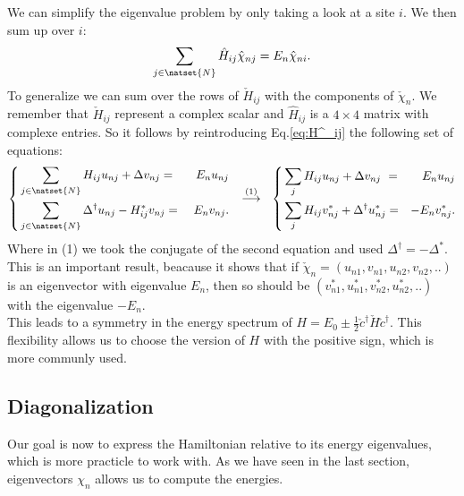 \documentclass[../main.tex]{subfile}
\begin{document}
We can simplify the eigenvalue problem by only taking a look at a site $i$. We then sum up over $i$: 
\[
    \sum_{j\in\natset{N}}\hat{H}_{ij} \hat{\chi}_{nj} = E_n \hat{\chi}_{ni}.
\]
To generalize we can sum over the rows of $\check{H}_{ij}$ with the components of $\check{\chi}_n$.
We remember that $\check{H}_{ij}$ represent a complex scalar and $\hat{H}_{ij}$ is a $4\times4$ matrix with complexe entries.
 So it follows by reintroducing Eq.\ref{eq:H^_ij} the following set of equations:
\begin{equation}
    \left\{
    \begin{aligned}
        &\sum_{j\in\natset{N}}H_{ij} u_{nj} + \Delta v_{nj} = &E_n u_{nj}\\
        &\sum_{j\in\natset{N}}\Delta^{\dagger} u_{nj} - H_{ij}^{\ast} v_{nj} =~& E_n v_{nj}.
    \end{aligned}
    \right.~~
    \stackrel{(1)}{\longrightarrow}~~
    \left\{
        \begin{aligned}
            &\sum_{j} H_{ij} u_{nj} + \Delta v_{nj} ~=& E_n u_{nj}\\
            &\sum_{j} H_{ij} v_{nj}^{\ast} + \Delta^{\dagger} u_{nj}^{\ast}= &-E_n v_{nj}^{\ast}.
        \end{aligned}
        \right.
\end{equation}
Where in (1) we took the conjugate of the second equation and used $\Delta^{\dagger} = -\Delta^{\ast}$.
This is an important result, beacause it shows that if $\check{\chi}_n = (u_{n1}, v_{n1},u_{n2}, v_{n2},.. )$ 
is an eigenvector with eigenvalue $E_n$, then  
so should be $(v_{n1}^{\ast}, u_{n1}^{\ast},v_{n2}^{\ast}, u_{n2}^{\ast},.. )$ with the eigenvalue $-E_n$.\\

This leads to a symmetry in the energy spectrum of $H = E_0 \pm \frac{1}{2}\check{c}^{\dagger}\check{H}\check{c}^{\dagger}$.
This flexibility allows us to choose the version of $H$ with the positive sign, which is more communly used.\\

\subsection{Diagonalization} \label{sec:Diagonalization}
Our goal is now to express the Hamiltonian relative to its energy eigenvalues, which is more practicle to work with.
As we have seen in the last section, eigenvectors $\chi_n$ allows us to compute the energies.\\
\end{document}
